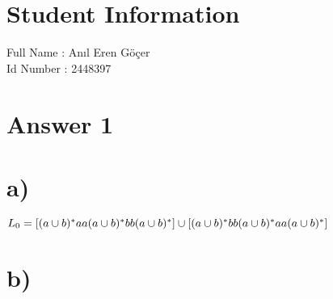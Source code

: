 \documentclass[11pt]{article}
\begin{document}
\section*{Student Information } 
Full Name : Anıl Eren Göçer\\
Id Number : 2448397 \\

\section*{Answer 1}

\section*{a)}
$L_0 = [(a \cup b)^*aa(a \cup b)^*bb(a \cup b)^*] \space \space \space \cup \space \space \space [(a \cup b)^*bb(a \cup b)^*aa(a \cup b)^*]$

\section*{b)}
\end{document}

